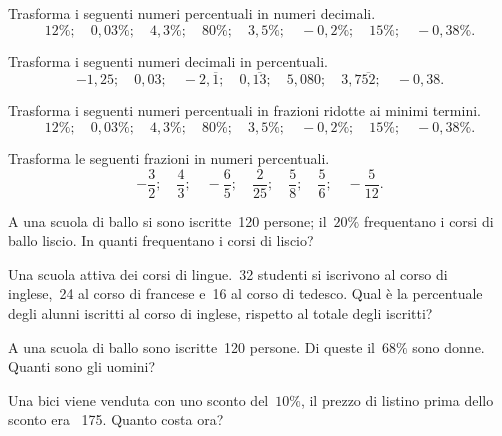\begin{esercizio}
 \label{ese:3.79}
Trasforma i seguenti numeri percentuali in numeri decimali.
\[12\%;\quad0,03\%;\quad4,3\%;\quad80\%;\quad3,5\%;\quad-0,2\%;\quad15\%;
\quad-0,38\%.\]
\end{esercizio}

\begin{esercizio}
 \label{ese:3.80}
Trasforma i seguenti numeri decimali in percentuali.
\[-1,25;\quad0,03;\quad-2,\overline{1};\quad0,\overline{13};\quad5,080;
\quad3,7\overline{52};\quad-0,38.\]
\end{esercizio}

\begin{esercizio}
 \label{ese:3.81}
Trasforma i seguenti numeri percentuali in frazioni ridotte ai minimi termini.
\[12\%;\quad0,03\%;\quad4,3\%;\quad80\%;\quad3,5\%;\quad-0,2\%;\quad15\%;
\quad-0,38\%.\]
\end{esercizio}

\begin{esercizio}
\label{ese:3.82}
Trasforma le seguenti frazioni in numeri percentuali.
\[-\frac{3}{2};\quad\frac{4}{3};\quad-\frac{6}{5};\quad\frac{2}{25};
\quad\frac{5}{8};\quad\frac{5}{6};\quad-\frac{5}{12}.\]
\end{esercizio}

\begin{esercizio}
 \label{ese:3.83}
A una scuola di ballo si sono iscritte~120 persone; il~\(20\%\) frequentano i 
corsi di ballo liscio. In quanti frequentano i corsi di liscio?
\end{esercizio}

\begin{esercizio}
 \label{ese:3.84}
Una scuola attiva dei corsi di lingue.~32 studenti si iscrivono al corso di 
inglese,~24 al corso di francese e~16 al corso di tedesco.
Qual è la percentuale degli alunni iscritti al corso di inglese, rispetto al 
totale degli iscritti?
\end{esercizio}

\begin{esercizio}
 \label{ese:3.85}
A una scuola di ballo sono iscritte~120 persone. Di queste il~\(68\%\) sono 
donne. Quanti sono gli uomini?
\end{esercizio}

\begin{esercizio}
 \label{ese:3.86}
 Una bici viene venduta con uno sconto del~\(10\%\), il prezzo di listino 
 prima dello sconto era \officialeuro\ 175. Quanto costa ora?
\end{esercizio}

